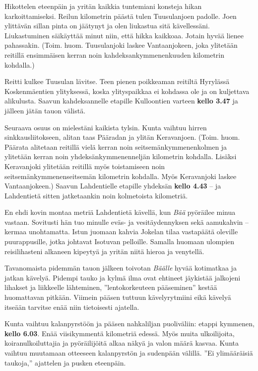 \begin{multicols}{2}
Hikottelen eteenpäin ja yritän kaikkia tuntemiani konsteja hikan 
karkoittamiseksi. Reilun kilometrin päästä tulen Tuusulanjoen padolle. Joen 
ylittävän sillan pinta on jäätynyt ja olen liukastua sitä kävellessäni. 
Liukastuminen säikäyttää minut niin, että hikka kaikkoaa. Jotain hyvää 
lienee pahassakin. (Toim. huom. Tuusulanjoki laskee Vantaanjokeen, joka 
ylitetään reitillä ensimmäisen kerran noin kahdeksankymmenenkuuden 
kilometrin kohdalla.)

Reitti kulkee Tuusulan lävitse. Teen pienen poikkeaman reitiltä Hyrylässä 
Koskenmäentien ylityksessä, koska ylityspaikkaa ei kohdassa ole ja on 
kuljettava alikulusta. Saavun kahdeksannelle etapille Kulloontien varteen 
\textbf{kello 3.47} ja jälleen jätän tauon välistä. 

Seuraava osuus on mielestäni kaikista tylsin. Kunta vaihtuu hirren 
sinkkausliitokseen, alitan taas Pääradan ja ylitän Keravanjoen. (Toim. huom. 
Päärata alitetaan reitillä vielä kerran noin seitsemänkymmenenkolmen ja 
ylitetään kerran noin yhdeksänkymmenenneljän kilometrin kohdalla. Lisäksi 
Keravanjoki ylitetään reitillä myös toistamiseen noin 
seitsemänkymmenenseitsemän kilometrin kohdalla. Myös Keravanjoki laskee 
Vantaanjokeen.) Saavun Lahdentielle etapille yhdeksän \textbf{kello 4.43} -- 
ja Lahdentietä sitten jatketaankin noin kolmetoista kilometriä. 

En ehdi kovin montaa metriä Lahdentietä kävellä, kun \textit{Bää} 
pyöräilee minua vastaan. Sovitusti hän tuo minulle eväs- ja 
vesitäydennyksen sekä aamukahvin -- kermaa unohtamatta. Istun juomaan kahvia 
Jokelan tilaa vastapäätä oleville puurappusille, jotka johtavat Isotuvan 
pelloille. Samalla huomaan ulompien reisilihasteni alkaneen kipeytyä ja 
yritän niitä hieroa ja venytellä. 

Tavanomaista pidemmän tauon jälkeen toivotan \textit{Bäälle} hyvää 
kotimatkaa ja jatkan kävelyä. Pidempi tauko ja kylmä ilma ovat ehtineet 
jäykistää jalkojeni lihakset ja liikkeelle lähteminen, ''lentokorkeuteen 
pääseminen'' kestää huomattavan pitkään. Viimein pääsen tuttuun 
kävelyrytmiini eikä kävelyä itseään tarvitse enää niin tietoisesti 
ajatella. 

Kunta vaihtuu kalanpyrstöön ja pääsen nahkaliljan puoliväliin: etappi 
kymmenen, \textbf{kello 6.03}. Enää viisikymmentä kilometriä edessä. Myös 
muita ulkoilijoita, koiranulkoiluttajia ja pyöräilijöitä alkaa näkyä ja 
valon määrä kasvaa. Kunta vaihtuu muutamaan otteeseen kalanpyrstön ja 
sudenpään välillä. ''Ei ylimääräisiä taukoja,'' ajattelen ja pusken 
eteenpäin.


\end{multicols}

